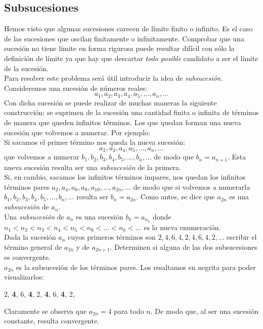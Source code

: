 \documentclass[../Teoría.root.tex]{subfiles}
\begin{document}
\subsection{Subsucesiones}
Hemos visto que algunas sucesiones carecen de límite finito o infinito.
Es el caso de las sucesiones que oscilan finitamente o infinitamente.
Comprobar que una sucesión no tiene límite en forma rigurosa puede resultar difícil con sólo la definición de límite ya que hay que descartar \textit{todo posible} candidato a ser el límite de la sucesión.\\
Para resolver este problema será útil introducir la idea de \textit{subsucesión}.\\
Consideremos una sucesión de números reales:
\[a_1,a_2,a_3,a_4,a_5,\dots,a_n,\dots\]
Con dicha sucesión se puede realizar de muchas maneras la siguiente construcción:
se suprimen de la sucesión una cantidad finita o infinita de términos de manera que queden infinitos términos.
Los que quedan forman una nueva sucesión que volvemos a numerar.
Por ejemplo:\\
Si sacamos el primer término nos queda la nueva sucesión:
\[a_2,a_3,a_4,a_5,\dots,a_n,\dots\]
que volvemos a numerar \(b_1,b_2,b_3,b_4,b_5,\dots,b_n,\dots\) de modo que \(b_n=a_{n+1}\).
Esta nueva sucesión resulta ser una \textit{subsucesión} de la primera.\\
Si, en cambio, sacamos los infinitos términos impares, nos quedan los infinitos términos pares \(a_2,a_4,a_6,a_8,a_{10},\dots,a_{2n},\dots\) de modo que si volvemos a numerarla \(b_1,b_2,b_3,b_4,b_5,\dots,b_n,\dots\) resulta ser \(b_n=a_{2n}\).
Como antes, se dice que \(a_{2n}\) es una \textit{subsucesión} de \(a_n\).\\
Una \textit{subsucesión} de \(a_n\) es una sucesión \(b_k=a_{ n_k}\) donde \(n_1<n_2<n_3<n_4<n_5<n_6<\dots<n_k<\dots\) es la nueva enumeración.\\
Dada la sucesión \(a_n\) cuyos primeros términos son \(2,4,6,4,2,4,6,4,2,\dots\) escribir el término general de \(a_{2n}\) y de \(a_{2n+1}\).
Determinen si alguna de las dos subsucesiones es convergente.\\
\(a_{2n}\) es la subsucesión de los términos pares.
Los resaltamos en negrita para poder visualizarlos:
\begin{center}
    2, \textbf{4}, 6, \textbf{4}, 2, \textbf{4}, 6, \textbf{4}, 2,
\end{center}
Claramente se observa que \(a_{2n}=4\) para todo \(n\).
De modo que, al ser una sucesión constante, resulta convergente.\\
\end{document}

